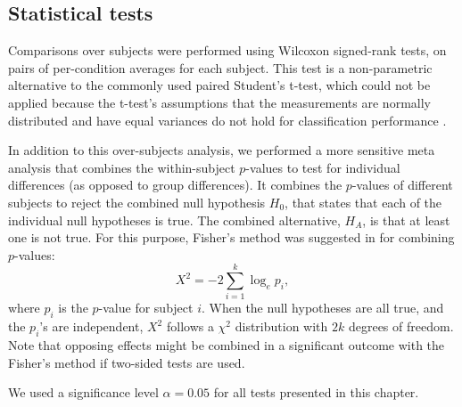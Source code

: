 \subsection{Statistical tests}
\begin{sloppypar}
Comparisons over subjects were performed using Wilcoxon signed-rank tests, on
pairs of per-condition averages for each subject. This test is a
non-pa\-ra\-me\-tric alternative to the commonly used paired Student's t-test,
which could not be applied because the t-test's assumptions that the
measurements are normally distributed and have equal variances do not hold for
classification performance \cite{demsar2006scc}. 
\end{sloppypar}

In addition to this over-subjects analysis, we performed a more sensitive meta
analysis that combines the within-subject $p$-values to test for individual
differences (as opposed to group differences). It combines the  $p$-values of
different subjects to reject the combined null hypothesis $H_0$, that states
that each of the individual null hypotheses is true. The combined alternative,
$H_A$, is that at least one is not true. For this purpose, Fisher's method was
suggested in \cite{loughin2004scm} for combining $p$-values:
%
\begin{equation} X^2 = -2 \sum_{i=1}^{k}\log_e{p_i}, \end{equation}
%
where $p_i$ is the $p$-value for subject $i$. When the null hypotheses are all
true, and the $p_i$'s are independent, $X^2$ follows a $\chi^2$ distribution
with $2k$ degrees of freedom. Note that opposing effects might be combined in a
significant outcome with the Fisher's method if two-sided tests are used.

We used a significance level $\alpha = 0.05$ for all tests presented in this
chapter. 

